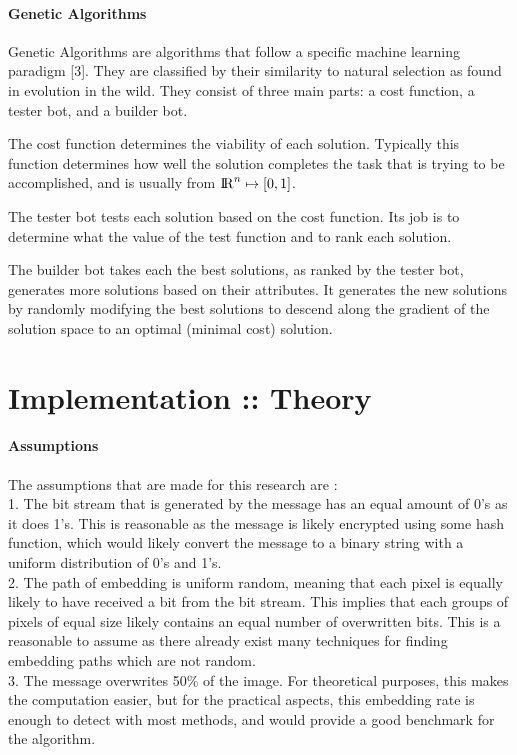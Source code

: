 \documentclass[12pt]{article}
\begin{document}
\paragraph{Genetic Algorithms}
\par Genetic Algorithms are algorithms that follow a specific machine learning paradigm [3]. They are classified by their similarity to natural selection as found in evolution in the wild. They consist of three main parts: a cost function, a tester bot, and a builder bot.
\par The cost function determines the viability of each solution. Typically this function determines how well the solution completes the task that is trying to be accomplished, and is usually from ${\rm I\!R}^n \mapsto [0, 1]$. 
\par The tester bot tests each solution based on the cost function. Its job is to determine what the value of the test function and to rank each solution.
\par The builder bot takes each the best solutions, as ranked by the tester bot, generates more solutions based on their attributes. It generates the new solutions by randomly modifying the best solutions to descend along the gradient of the solution space to an optimal (minimal cost) solution.

\section{Implementation :: Theory}
\paragraph{Assumptions}
\par The assumptions that are made for this research are :
\\ 1. The bit stream that is generated by the message has an equal amount of 0's as it does 1's. This is reasonable as the message is likely encrypted using some hash function, which would likely convert the message to a binary string with a uniform distribution of 0's and 1's.
\\ 2. The path of embedding is uniform random, meaning that each pixel is equally likely to have received a bit from the bit stream. This implies that each groups of pixels of equal size likely contains an equal number of overwritten bits. This is a reasonable to assume as there already exist many techniques for finding embedding paths which are not random. 
\\ 3. The message overwrites 50\% of the image. For theoretical purposes, this makes the computation easier, but for the practical aspects, this embedding rate is enough to detect with most methods, and would provide a good benchmark for the algorithm.
 
\end{document}
